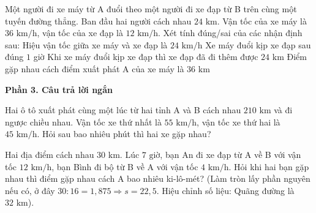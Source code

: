 \begin{ex} %
Một người đi xe máy từ A đuổi theo một người đi xe đạp từ B trên cùng một tuyến đường thẳng. Ban đầu hai người cách nhau $24\text{ km}$. Vận tốc của xe máy là $36\text{ km/h}$, vận tốc của xe đạp là $12\text{ km/h}$. Xét tính đúng/sai của các nhận định sau:
\choiceTF
{\True Hiệu vận tốc giữa xe máy và xe đạp là $24\text{ km/h}$}
{\True Xe máy đuổi kịp xe đạp sau đúng $1$ giờ}
{Khi xe máy đuổi kịp xe đạp thì xe đạp đã đi thêm được $24\text{ km}$}
{\True Điểm gặp nhau cách điểm xuất phát A của xe máy là $36\text{ km}$}
\end{ex}

\textbf{Phần 3. Câu trả lời ngắn}

\begin{ex} %
Hai ô tô xuất phát cùng một lúc từ hai tỉnh A và B cách nhau $210\text{ km}$ và đi ngược chiều nhau. Vận tốc xe thứ nhất là $55\text{ km/h}$, vận tốc xe thứ hai là $45\text{ km/h}$. Hỏi sau bao nhiêu phút thì hai xe gặp nhau?
\end{ex}

\begin{ex} %
Hai địa điểm cách nhau $30\text{ km}$. Lúc $7\text{ giờ}$, bạn An đi xe đạp từ A về B với vận tốc $12\text{ km/h}$, bạn Bình đi bộ từ B về A với vận tốc $4\text{ km/h}$. Hỏi khi hai bạn gặp nhau thì điểm gặp nhau cách A bao nhiêu ki-lô-mét? (Làm tròn lấy phần nguyên nếu có, ở đây $30 : 16 = 1{,}875 \Rightarrow s = 22{,}5$. Hiệu chỉnh số liệu: Quãng đường là $32\text{ km}$).
\end{ex}

